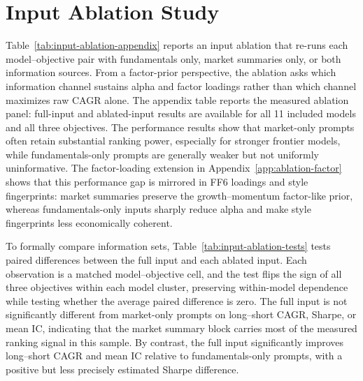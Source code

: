 \section{Input Ablation Study}
\label{app:input-ablation}

Table~\ref{tab:input-ablation-appendix} reports an input ablation that re-runs each model--objective pair with fundamentals only, market summaries only, or both information sources.
From a factor-prior perspective, the ablation asks which information channel sustains alpha and factor loadings rather than which channel maximizes raw CAGR alone.
The appendix table reports the measured ablation panel: full-input and ablated-input results are available for all 11 included models and all three objectives.
The performance results show that market-only prompts often retain substantial ranking power, especially for stronger frontier models, while fundamentals-only prompts are generally weaker but not uniformly uninformative.
The factor-loading extension in Appendix~\ref{app:ablation-factor} shows that this performance gap is mirrored in FF6 loadings and style fingerprints: market summaries preserve the growth--momentum factor-like prior, whereas fundamentals-only inputs sharply reduce alpha and make style fingerprints less economically coherent.



To formally compare information sets, Table~\ref{tab:input-ablation-tests} tests paired differences between the full input and each ablated input.
Each observation is a matched model--objective cell, and the test flips the sign of all three objectives within each model cluster, preserving within-model dependence while testing whether the average paired difference is zero.
The full input is not significantly different from market-only prompts on long--short CAGR, Sharpe, or mean IC, indicating that the market summary block carries most of the measured ranking signal in this sample.
By contrast, the full input significantly improves long--short CAGR and mean IC relative to fundamentals-only prompts, with a positive but less precisely estimated Sharpe difference.



\clearpage
